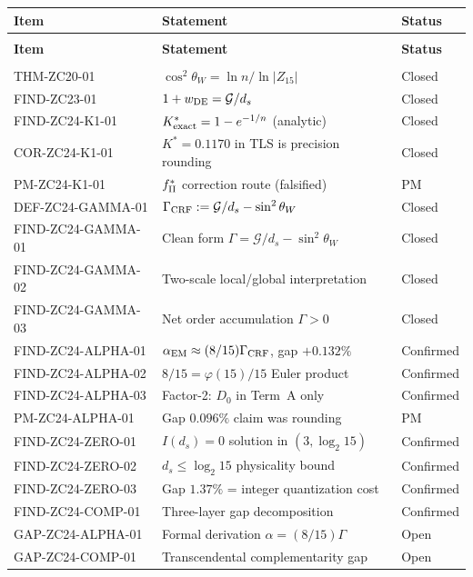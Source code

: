 \documentclass[12pt, a4paper]{article}
\begin{document}
\begin{derivedbox}[title={Z-Programme Status after TASK-ZC24}]
{\small
\setlength{\LTpre}{4pt}
\setlength{\LTpost}{4pt}
\renewcommand{\arraystretch}{1.30}
\begin{longtable}{>{\raggedright\arraybackslash}p{3.5cm}
                  >{\raggedright\arraybackslash}p{7.0cm}
                  >{\centering\arraybackslash}p{1.5cm}}
\toprule
\textbf{Item} & \textbf{Statement} & \textbf{Status} \\
\midrule
\endfirsthead
\multicolumn{3}{l}{\small\textit{(continued)}}\\[4pt]
\toprule
\textbf{Item} & \textbf{Statement} & \textbf{Status} \\
\midrule
\endhead
\midrule
\multicolumn{3}{r}{\small\textit{(continues)}}\\
\endfoot
\bottomrule
\endlastfoot
THM-ZC20-01 & $\cos^2\theta_W = \ln n/\ln|Z_{15}|$ & Closed \\
FIND-ZC23-01 & $1+w_{\rm DE} = \mathcal{G}/d_s$ & Closed \\
\midrule
FIND-ZC24-K1-01  & $K^*_{\rm exact}=1-e^{-1/n}$ (analytic) & Closed \\
COR-ZC24-K1-01   & $K^*=0.1170$ in TLS is precision rounding & Closed \\
PM-ZC24-K1-01    & $f_{\rm II}^*$ correction route (falsified) & PM \\
\midrule
DEF-ZC24-GAMMA-01 & $\Gamma_{\rm CRF}:=\mathcal{G}/d_s-\sin^2\theta_W$ & Closed \\
FIND-ZC24-GAMMA-01 & Clean form $\Gamma=\mathcal{G}/d_s-\sin^2\theta_W$ & Closed \\
FIND-ZC24-GAMMA-02 & Two-scale local/global interpretation & Closed \\
FIND-ZC24-GAMMA-03 & Net order accumulation $\Gamma>0$ & Closed \\
\midrule
FIND-ZC24-ALPHA-01 & $\alpha_{\rm EM}\approx(8/15)\Gamma_{\rm CRF}$, gap $+0.132\%$ & Confirmed \\
FIND-ZC24-ALPHA-02 & $8/15=\varphi(15)/15$ Euler product & Confirmed \\
FIND-ZC24-ALPHA-03 & Factor-2: $D_0$ in Term~A only & Confirmed \\
PM-ZC24-ALPHA-01   & Gap $0.096\%$ claim was rounding & PM \\
\midrule
FIND-ZC24-ZERO-01 & $I(d_s)=0$ solution in $(3,\log_2 15)$ & Confirmed \\
FIND-ZC24-ZERO-02 & $d_s\leq\log_2 15$ physicality bound & Confirmed \\
FIND-ZC24-ZERO-03 & Gap $1.37\%$ = integer quantization cost & Confirmed \\
FIND-ZC24-COMP-01 & Three-layer gap decomposition & Confirmed \\
\midrule
GAP-ZC24-ALPHA-01 & Formal derivation $\alpha=(8/15)\Gamma$ & Open \\
GAP-ZC24-COMP-01  & Transcendental complementarity gap & Open \\
\end{longtable}
}
\vspace{-6pt}
\end{derivedbox}
\end{document}
